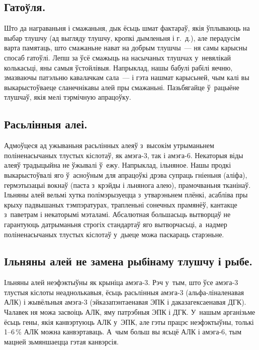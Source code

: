 \subsection{Гатоўля.}
Што да награваньня і смажаньня, дык ёсьць шмат фактараў, якія ўплываюць на выбар тлушчу (ад выгляду тлушчу, кропкі дымленьня і г.~д.), але перадусім варта памятаць, што смажаньне нават на добрым тлушчы~--- ня самы карысны спосаб гатоўлі. Лепш за ўсё смажыць на насычаных тлушчах у~невялікай колькасьці, яны самыя ўстойлівыя. Напрыклад, нашы бабулі рабілі яечню, змазваючы патэльню кавалачкам сала~--- і гэта нашмат карысьней, чым калі вы выкарыстоўваеце сланечнікавы алей пры смажаньні. Пазьбягайце ў~рацыёне тлушчаў, якія мелі тэрмічную апрацоўку.

\subsection{Расьлінныя алеі.}
Адмоўцеся ад ужываньня расьлінных алеяў з~высокім утрыманьнем поліненасычаных тлустых кіслотаў, як амэга-3, так і амэга-6. Некаторыя віды алеяў традыцыйна не ўжывалі ў~ежу. Напрыклад, ільняное. Нашы продкі выкарыстоўвалі яго ў~асноўным для апрацоўкі дрэва супраць гніеньня (аліфа), гермэтызацыі вокнаў (паста з~крэйды і льнянога алею), прамочваньня тканінаў. Ільняны алей вельмі хутка полімэрызуецца з~утварэньнем плёнкі, асабліва пры крыху падвышаных тэмпэратурах, трапленьні сонечных прамянёў, кантакце з~паветрам і некаторымі мэталамі. Абсалютная большасьць вытворцаў не гарантуюць датрыманьня строгіх стандартаў яго вытворчасьці, а~надмер поліненасычаных тлустых кіслотаў у~дыеце можа паскараць старэньне.


\subsection{Ільняны алей не замена рыбінаму тлушчу і рыбе.}
Ільняны алей неэфэктыўны як крыніца амэга-3. Рэч у~тым, што ўсе амэга-3 тлустыя кіслоты неаднолькавыя, ёсьць расьлінныя амэга-3 (альфа-ліналенавая АЛК) і жывёльныя амэга-3 (эйказапэнтаенавая ЭПК і даказагексаенавая ДГК). Чалавек ня можа засвоіць АЛК, яму патрэбныя ЭПК і ДГК. У~нашым арганізьме ёсьць гены, якія канвэртуюць АЛК у~ЭПК, але гэты працэс неэфэктыўны, толькі 1--6\,\% АЛК можна канвэртаваць. А~чым больш вы ясьцё АЛК і амэга-6, тым мацней зьмяншаецца гэтая канвэрсія.

